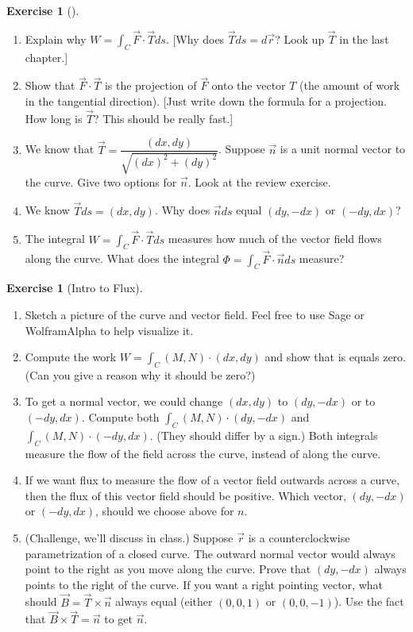 \documentclass[10pt,]{book}
\theoremstyle{plain}
\theoremstyle{definition}
\theoremstyle{definition}
\theoremstyle{definition}
\theoremstyle{definition}
\newtheorem{exploration}[project]{Exercise}
\theoremstyle{definition}
\numberwithin{equation}{section}
\newcommand{\ds}{\displaystyle}
\begin{document}
\begin{exploration}[]\label{exploration-193}
\leavevmode%
\begin{enumerate}[font=\bfseries,label=(\alph*),ref=\alph*]
\item\label{task-484} Explain why \(W = \int_C \vec F\cdot \vec T ds\). [Why does \(\vec T ds = d\vec r\)?  Look up \(\vec T\) in the last chapter.] %
\item\label{task-485} Show that \(\vec F\cdot \vec T\) is the projection of \(\vec F\) onto the vector \(T\) (the amount of work in the tangential direction). [Just write down the formula for a projection.  How long is \(\vec T\)?  This should be really fast.]%
\item\label{task-486} We know that \(\vec T = \dfrac{(dx, dy)}{\sqrt{(dx)^2+(dy)^2}}\).  Suppose \(\vec n\) is a unit normal vector to the curve. Give two options for \(\vec n\). Look at the review exercise.%
%
\item\label{task-487} We know  \(\vec T ds = (dx,dy)\). Why does \(\vec n ds\) equal \((dy,-dx)\) or \((-dy,dx)\)?%
\item\label{task-488} The integral \(W = \int_C \vec F\cdot \vec T ds\) measures how much of the vector field flows along the curve.  What does the integral \(\Phi = \int_C \vec F\cdot \vec n ds\) measure?%
\end{enumerate}
\end{exploration}
\begin{exploration}[Intro to Flux]\label{exploration-194}
\leavevmode%
\begin{enumerate}[font=\bfseries,label=(\alph*),ref=\alph*]
\item\label{task-489} Sketch a picture of the curve and vector field. Feel free to use Sage or WolframAlpha to help visualize it.%
\item\label{task-490} Compute the work \(\ds W= \int_C (M,N)\cdot (dx,dy)\) and show that is equals zero. (Can you give a reason why it should be zero?)  %
\item\label{task-491} To get a normal vector, we could change \((dx,dy)\) to \((dy,-dx)\) or to \((-dy,dx)\). Compute both \(\ds \int_C (M,N)\cdot (dy,-dx)\) and \(\ds \int_C (M,N)\cdot (-dy,dx)\). (They should differ by a sign.) Both integrals measure the flow of the field across the curve, instead of along the curve.%
\item\label{task-492} If we want flux to measure the flow of a vector field outwards across a curve, then the flux of this vector field should be positive.  Which vector, \((dy,-dx)\) or \((-dy,dx)\),  should we choose above for \(n\).  %
\item\label{task-493} (Challenge, we'll discuss in class.) Suppose \(\vec r\) is a counterclockwise parametrization of a closed curve.  The outward normal vector would always point to the right as you move along the curve.  Prove that \((dy,-dx)\) always points to the right of the curve. If you want a right pointing vector, what should \(\vec B=\vec T\times \vec n\) always equal (either \((0,0,1)\) or \((0,0,-1)\)). Use the fact that \(\vec B\times \vec T = \vec n\) to get \(\vec n\).%
%
\end{enumerate}
\end{exploration}
\end{document}

